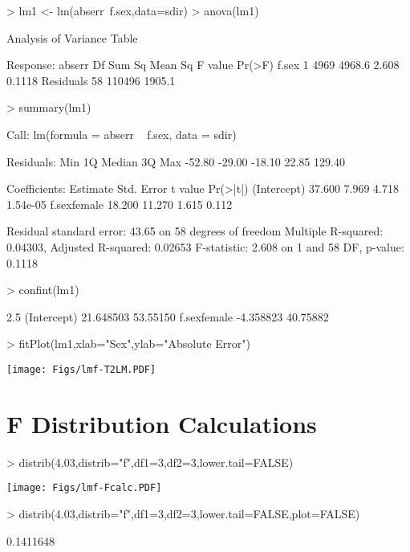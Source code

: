 \documentclass[a4paper]{article}
\begin{document}
\begin{Schunk}
\begin{Sinput}
> lm1 <- lm(abserr~f.sex,data=sdir)
> anova(lm1)
\end{Sinput}
\begin{Soutput}
Analysis of Variance Table

Response: abserr
          Df Sum Sq Mean Sq F value Pr(>F)
f.sex      1   4969  4968.6   2.608 0.1118
Residuals 58 110496  1905.1               
\end{Soutput}
\begin{Sinput}
> summary(lm1)
\end{Sinput}
\begin{Soutput}
Call:
lm(formula = abserr ~ f.sex, data = sdir)

Residuals:
   Min     1Q Median     3Q    Max 
-52.80 -29.00 -18.10  22.85 129.40 

Coefficients:
            Estimate Std. Error t value Pr(>|t|)
(Intercept)   37.600      7.969   4.718 1.54e-05
f.sexfemale   18.200     11.270   1.615    0.112

Residual standard error: 43.65 on 58 degrees of freedom
Multiple R-squared: 0.04303,	Adjusted R-squared: 0.02653 
F-statistic: 2.608 on 1 and 58 DF,  p-value: 0.1118 
\end{Soutput}
\begin{Sinput}
> confint(lm1)
\end{Sinput}
\begin{Soutput}
                2.5 %   97.5 %
(Intercept) 21.648503 53.55150
f.sexfemale -4.358823 40.75882
\end{Soutput}
\begin{Sinput}
> fitPlot(lm1,xlab="Sex",ylab="Absolute Error")
\end{Sinput}
\end{Schunk}
\vspace{-12pt}
\texttt{[image: Figs/lmf-T2LM.PDF]}


\section{F Distribution Calculations}
\begin{Schunk}
\begin{Sinput}
> distrib(4.03,distrib="f",df1=3,df2=3,lower.tail=FALSE)
\end{Sinput}
\end{Schunk}
\texttt{[image: Figs/lmf-Fcalc.PDF]}

\begin{Schunk}
\begin{Sinput}
> distrib(4.03,distrib="f",df1=3,df2=3,lower.tail=FALSE,plot=FALSE)
\end{Sinput}
\begin{Soutput}
[1] 0.1411648
\end{Soutput}
\end{Schunk}
\end{document}
